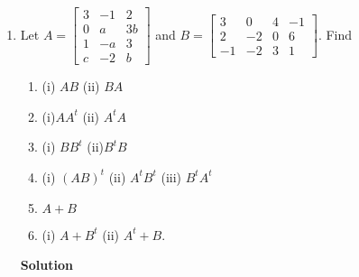 \begin{enumerate}
\item Let $A=\left [ \begin{array}{rrr}
                        3&-1&2\\
                        0&a&3b\\
                        1&-a&3\\
                        c&-2&b \end{array} \right ]$ and
$B=\left [ \begin{array}{rrrr}
                        3&0&4&-1\\
                        2&-2&0&6\\
                        -1&-2&3&1 \end{array} \right ]$. Find
\begin{enumerate}
\item (i) $AB$ \quad \quad (ii) $BA$
\item (i)$AA^t$ \quad \quad (ii) $A^tA$
\item (i) $BB^t$ \quad \quad (ii)$B^tB$
\item (i) $(AB)^t$ \quad \quad (ii) $A^tB^t$ \quad \quad (iii) $B^tA^t$
\item $A+B$
\item (i) $A+B^t$ \quad \quad (ii) $A^t+B$.
\end{enumerate}


\noindent \textbf{Solution}
\end{enumerate}

